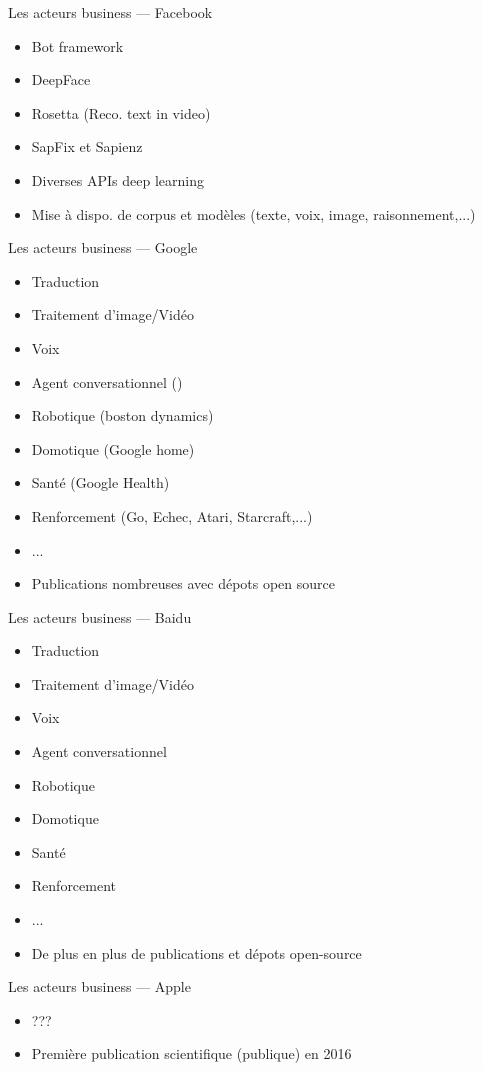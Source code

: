 \begin{frame}{Les acteurs business --- Facebook}
  \begin{itemize}
  \item Bot framework
  \item DeepFace
  \item Rosetta (Reco. text in video)
  \item SapFix et Sapienz 
  \item Diverses APIs deep learning
  \item Mise à dispo. de corpus et modèles (texte, voix, image, raisonnement,...)
  \end{itemize}
\end{frame}

\begin{frame}{Les acteurs business --- Google}
  \begin{itemize}
  \item Traduction
  \item Traitement d'image/Vidéo
  \item Voix
  \item Agent conversationnel (\href{https://www.youtube.com/watch?v=d40jgFZ5hXk}{})
  \item Robotique (boston dynamics)
  \item Domotique (Google home)
  \item Santé (Google Health)
  \item Renforcement (Go, Echec, Atari, Starcraft,...)
  \item ...
  \item Publications nombreuses avec dépots open source
  \end{itemize}
\end{frame}

\begin{frame}{Les acteurs business --- Baidu}
  \begin{itemize}
  \item Traduction
  \item Traitement d'image/Vidéo
  \item Voix
  \item Agent conversationnel
  \item Robotique
  \item Domotique
  \item Santé
  \item Renforcement
  \item ...
  \item De plus en plus de publications et dépots open-source
  \end{itemize}
\end{frame}

\begin{frame}{Les acteurs business --- Apple}
  \begin{itemize}
  \item ???
  \item Première publication scientifique (publique) en 2016
  \end{itemize}
\end{frame}
